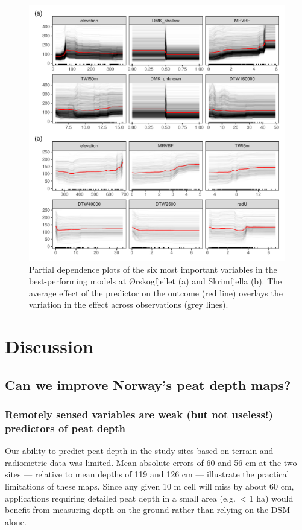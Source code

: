 \documentclass[soil, manuscript]{copernicus}
\begin{document}
\begin{figure}
\centering
\includegraphics{figures/partial_dependence.pdf}
\caption{\label{fig:pdps}Partial dependence plots of the six most important variables in the best-performing models at Ørskogfjellet (a) and Skrimfjella (b). The average effect of the predictor on the outcome (red line) overlays the variation in the effect across observations (grey lines).}
\end{figure}

\section{Discussion}

\subsection{Can we improve Norway's peat depth maps?}

\subsubsection{Remotely sensed variables are weak (but not useless!) predictors of peat depth}

Our ability to predict peat depth in the study sites based on terrain and radiometric data was limited.
Mean absolute errors of 60 and 56 cm at the two sites --- relative to mean depths of 119 and 126 cm --- illustrate the practical limitations of these maps.
Since any given 10 m cell will miss by about 60 cm, applications requiring detailed peat depth in a small area (e.g.~\textless{} 1 ha) would benefit from measuring depth on the ground rather than relying on the DSM alone.
\end{document}
